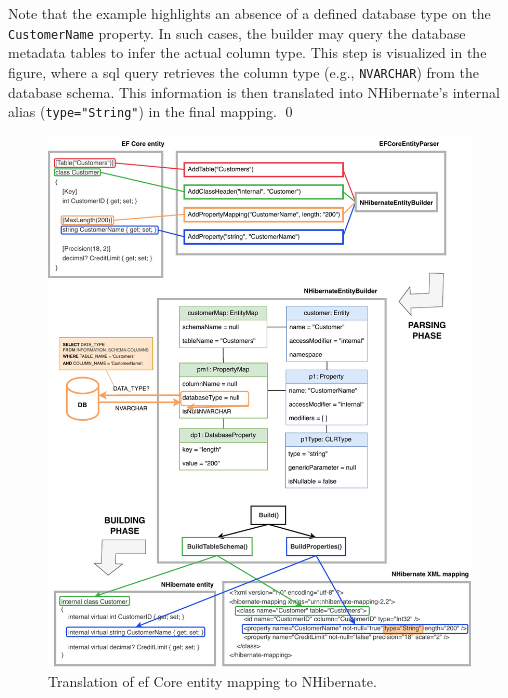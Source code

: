 \begin{example}
Note that the example highlights an absence of a defined database type on the \texttt{CustomerName} property. In such cases, the builder may query the database metadata tables to infer the actual column type. This step is visualized in the figure, where a \acrshort{sql} query retrieves the column type (e.g., \texttt{NVARCHAR}) from the database schema. This information is then translated into NHibernate's internal alias (\texttt{type="String"}) in the final mapping.
\qed
\end{example}

\begin{figure}[!htp]
  \centering
  \includegraphics[width=\textwidth]{thesis/img/thesis/03_parsing_building.drawio.pdf}
  \caption{Translation of \acrshort{ef} Core entity mapping to NHibernate.}
  \label{fig:translation_complete}
\end{figure}

